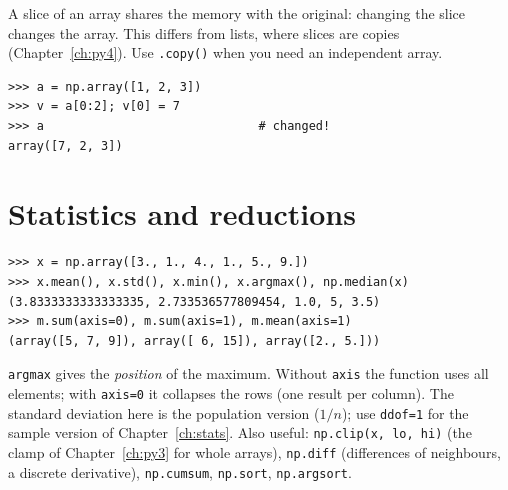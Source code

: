 \begin{keyidea}
A slice of an array shares the memory with the original: changing the slice changes the array. This differs from lists, where slices are copies (Chapter~\ref{ch:py4}). Use \texttt{.copy()} when you need an independent array.
\end{keyidea}
\begin{verbatim}
>>> a = np.array([1, 2, 3])
>>> v = a[0:2]; v[0] = 7
>>> a                              # changed!
array([7, 2, 3])
\end{verbatim}

\section*{Statistics and reductions}
\begin{verbatim}
>>> x = np.array([3., 1., 4., 1., 5., 9.])
>>> x.mean(), x.std(), x.min(), x.argmax(), np.median(x)
(3.8333333333333335, 2.733536577809454, 1.0, 5, 3.5)
>>> m.sum(axis=0), m.sum(axis=1), m.mean(axis=1)
(array([5, 7, 9]), array([ 6, 15]), array([2., 5.]))
\end{verbatim}
\texttt{argmax} gives the \emph{position} of the maximum. Without \texttt{axis} the function uses all elements; with \texttt{axis=0} it collapses the rows (one result per column). The standard deviation here is the population version ($1/n$); use \texttt{ddof=1} for the sample version of Chapter~\ref{ch:stats}. Also useful: \texttt{np.clip(x, lo, hi)} (the clamp of Chapter~\ref{ch:py3} for whole arrays), \texttt{np.diff} (differences of neighbours, a discrete derivative), \texttt{np.cumsum}, \texttt{np.sort}, \texttt{np.argsort}.

